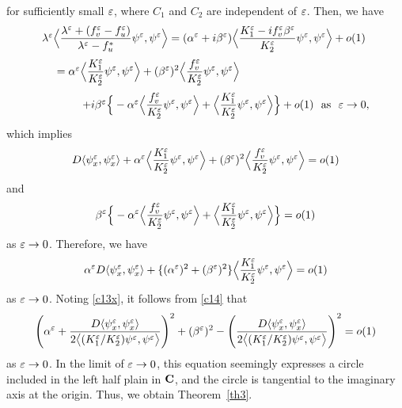 \documentclass[a4,10pt]{article}
\begin{document}
%
for sufficiently small $\varepsilon$, where $C_1$ and $C_2$ are independent of $\varepsilon$.
Then, we have
%
$$
\begin{array}{l}
\lambda^\ep \Big{\lg} 
\dis\frac{\lambda^\ep + (f_v^\ep - f_u^\ep )}{\lambda^\ep - f_u^*}\psi^\ep, \psi^\ep \Big{\rg} 
= 
(\alpha^\ep + i \beta^\ep ) \Big{\lg} 
\frac{K_1^\ep - i f_v^\ep \beta^\ep}{K_2^\ep}\psi^\ep, \psi^\ep \Big{\rg} + o(1)
\\[3ex]
\ \ \ \ 
= \alpha^\ep \Big{\lg} \dis\frac{K_1^\ep }{K_2^\ep}\psi^\ep, \psi^\ep \Big{\rg} 
+  (\beta^\ep)^2 \Big{\lg}  \frac{f_v^\ep }{K_2^\ep}\psi^\ep, \psi^\ep \Big{\rg} 
\\[3ex]
\ \ \ \ \ \ \ \ \ \ \ 
+ i \beta^\ep \Big{\{} - \alpha^\ep \Big{\lg}  \dis\frac{f_v^\ep }{K_2^\ep}\psi^\ep, \psi^\ep \Big{\rg} 
+ \Big{\lg} \frac{K_1^\ep }{K_2^\ep}\psi^\ep, \psi^\ep \Big{\rg} \Big{\}} + o(1) 
\ \ \text{as} \ \ \ep \to 0,
\end{array}
$$
%
which implies
%
\[%
D \lg  \psi^\ep_x, \psi^\ep_x \rg + \alpha^\ep \Big{\lg} \dis\frac{K_1^\ep }{K_2^\ep}\psi^\ep, \psi^\ep \Big{\rg} 
+  (\beta^\ep)^2 \Big{\lg}  \frac{f_v^\ep }{K_2^\ep}\psi^\ep, \psi^\ep \Big{\rg}  = o(1)
\]%
%
and
%
\[%
\beta^\ep \Big{\{} - \alpha^\ep \Big{\lg}  \dis\frac{f_v^\ep }{K_2^\ep}\psi^\ep, \psi^\ep \Big{\rg} 
+ \Big{\lg} \frac{K_1^\ep }{K_2^\ep}\psi^\ep, \psi^\ep \Big{\rg} \Big{\}} = o(1) 
\]%
%
as $\varepsilon \to 0$. Therefore, we have
%
\begin{equation}\label{c14}
\alpha^\varepsilon D \langle  \psi^\varepsilon_x, \psi^\varepsilon_x \rangle 
+ \{ (\alpha^\varepsilon)^2 +  (\beta^\varepsilon)^2 \} \Big{\langle} \displaystyle\frac{K_1^\varepsilon }{K_2^\varepsilon}\psi^\varepsilon, \psi^\varepsilon \Big{\rangle} 
= o(1)
\end{equation}
%
%
as $\varepsilon \to 0$. 
Noting \eqref{c13x}, it follows from \eqref{c14} that
%
$$%
\left( \alpha^\ep + \frac{D \lg  \psi^\ep_x, \psi^\ep_x \rg }{2 \big{\lg} (K_1^\ep/K_2^\ep) \psi^\ep, \psi^\ep \big{\rg} } 
\right)^2 + ( \beta^\ep )^{2} -
\left( \frac{D \lg  \psi^\ep_x, \psi^\ep_x \rg }{2  \big{\lg} (K_1^\ep/K_2^\ep) \psi^\ep, \psi^\ep\big{\rg} } \right)^2 = o(1)
$$%
%
as $\varepsilon \to 0$. In the limit of $\varepsilon \to 0$, this equation seemingly expresses
a circle included in the 
left half plain in $\mbox{\bf C}$, and the circle is tangential to the imaginary axis at the origin.
Thus, we obtain Theorem~\ref{th3}.  \Qed \\
\end{document}
